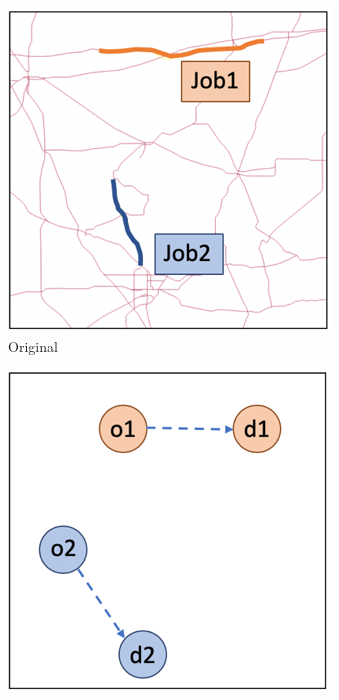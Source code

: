 \documentclass[numbered]{trbunofficial}
\begin{document}
\begin{figure}[!ht]
    \centering
    \begin{subfigure}[b]{0.31\textwidth}
    \includegraphics[width=\textwidth]{figures/fig2-1.PNG}
    \caption{Original}
    \label{fig:2-1}
    \end{subfigure}
    \begin{subfigure}[b]{0.31\textwidth}
    \includegraphics[width=\textwidth]{figures/fig2-2.PNG}

\end{subfigure}
\end{figure}
\end{document}
